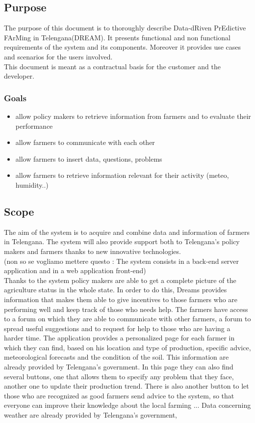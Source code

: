 \subsection{Purpose}
The purpose of this document is to thoroughly describe 
Data-dRiven PrEdictive FArMing in Telengana(DREAM).
It presents functional and non functional requirements of the system and its components.
Moreover it provides use cases and scenarios for the users involved.
\\This document is meant as a contractual basis for the customer and the developer.

\subsubsection{Goals}\label{section:1.1.1}
\begin{itemize}
    \item  allow policy makers to retrieve information from farmers and to evaluate their performance
    \item allow farmers to communicate with each other
    \item allow farmers to insert data, questions, problems
    \item allow farmers to retrieve information relevant for their activity (meteo, humidity..)
\end{itemize}

\subsection{Scope}
The aim of the system is to acquire and combine data and 
information of farmers in Telengana. 
The system will also provide support both to Telengana's 
policy makers and farmers thanks to 
new innovative technologies.
\\
(non so se vogliamo mettere questo : The system consists in a back-end server application and in a web application front-end)
\\
Thanks to the system policy makers are able to get a complete picture of the agriculture status in the whole state.
    In order to do this,  Dreams provides information that makes them able to give incentives to those farmers who are performing well and keep track of those who needs help.
    The farmers have access to a forum on which they are able to communicate with other farmers, a forum to spread useful suggestions and to request for help to those who are having a harder time.
    The application provides a personalized page for each farmer in which they can find, based on his location and type of production, specific advice, meteorological forecasts and the condition of the soil.
    This information are already provided by Telengana's government.
    In this page they can also find several buttons, one that allows them to specify any problem that they face,
    another one to update their production trend. There is also another button to let those who are recognized as good farmers send advice to the system, so that everyone can improve their knowledge about the local farming ...
    Data concerning weather are already provided by Telengana's government,

